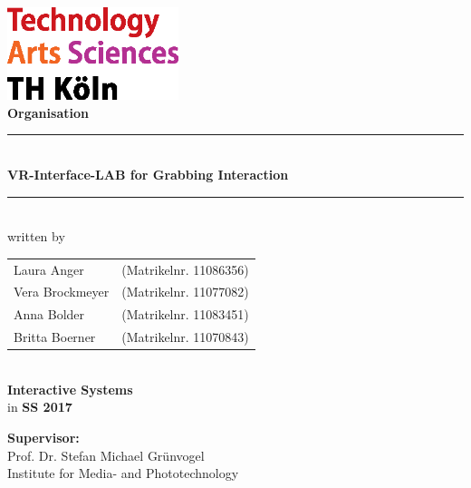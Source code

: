 \thispagestyle{empty}
\begin{center}
			\includegraphics[width=5cm]{Bilder/logo_TH}\\[12ex]
			{\Huge\textbf{Organisation}}\\[8ex]
			\rule{.8\textwidth}{.2pt}
			{\Large\\[1ex] \textbf{VR-Interface-LAB for Grabbing Interaction}}\\
			\rule{.8\textwidth}{.2pt}\\[10ex]
			written by\\[2ex]
			\begin{tabular}{ll}
			Laura Anger &(Matrikelnr. 11086356)\\ 
			Vera Brockmeyer &(Matrikelnr. 11077082)\\
			Anna Bolder &(Matrikelnr. 11083451)\\
			Britta Boerner &(Matrikelnr. 11070843)\\
			\end{tabular}\\[10ex]
			\textbf{Interactive Systems}\\
			in \textbf{SS 2017}\\			
			\end{center}
			\vfill
			\begin{flushleft}
			{\bf Supervisor:}\\
			Prof. Dr. Stefan Michael Grünvogel\\
			Institute for Media- and Phototechnology
			\end{flushleft}
	\newpage